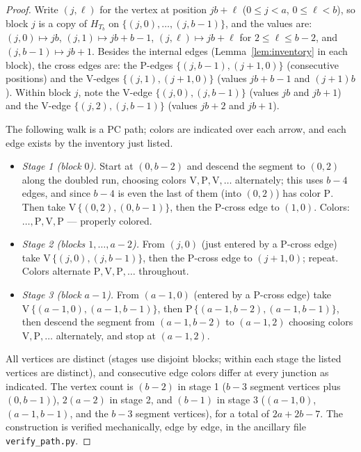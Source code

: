 \documentclass[11pt]{article}
\theoremstyle{definition}
\begin{document}
\begin{proof}
Write $(j, \ell)$ for the vertex at position $jb + \ell$ ($0 \le j < a$,
$0 \le \ell < b$), so block $j$ is a copy of $H_{T_b}$ on $\{(j,0), \dots,
(j,b-1)\}$, and the values are: $(j,0) \mapsto jb$, $(j,1) \mapsto jb + b - 1$,
$(j,\ell) \mapsto jb + \ell$ for $2 \le \ell \le b-2$, and
$(j, b-1) \mapsto jb + 1$. Besides the internal edges (Lemma~\ref{lem:inventory} in
each block), the cross edges are: the P-edges $\{(j, b-1), (j+1, 0)\}$ (consecutive
positions) and the V-edges $\{(j, 1), (j+1, 0)\}$ (values $jb + b - 1$ and
$(j+1)b$). Within block $j$, note the V-edge $\{(j,0), (j,b-1)\}$ (values $jb$ and
$jb+1$) and the V-edge $\{(j,2), (j,b-1)\}$ (values $jb+2$ and $jb+1$).

The following walk is a PC path; colors are indicated over each arrow, and each edge
exists by the inventory just listed.
\begin{itemize}
\item \emph{Stage 1 (block $0$).} Start at $(0, b-2)$ and descend the segment to
$(0, 2)$ along the doubled run, choosing colors
$\mathrm V, \mathrm P, \mathrm V, \dots$ alternately; this uses $b - 4$ edges, and
since $b - 4$ is even the last of them (into $(0,2)$) has color $\mathrm P$. Then
take $\mathrm V\,\{(0,2), (0,b-1)\}$, then the P-cross edge to $(1, 0)$. Colors:
$\dots, \mathrm P, \mathrm V, \mathrm P$ --- properly colored.
\item \emph{Stage 2 (blocks $1, \dots, a-2$).} From $(j, 0)$ (just entered by a
P-cross edge) take $\mathrm V\,\{(j,0), (j,b-1)\}$, then the P-cross edge to
$(j+1, 0)$; repeat. Colors alternate $\mathrm P, \mathrm V, \mathrm P, \dots$
throughout.
\item \emph{Stage 3 (block $a-1$).} From $(a-1, 0)$ (entered by a P-cross edge)
take $\mathrm V\,\{(a-1,0), (a-1,b-1)\}$, then $\mathrm P\,\{(a-1,b-2),
(a-1,b-1)\}$, then descend the segment from $(a-1, b-2)$ to $(a-1, 2)$ choosing
colors $\mathrm V, \mathrm P, \dots$ alternately, and stop at $(a-1, 2)$.
\end{itemize}
All vertices are distinct (stages use disjoint blocks; within each stage the listed
vertices are distinct), and consecutive edge colors differ at every junction as
indicated. The vertex count is $(b - 2)$ in stage 1 ($b-3$ segment vertices plus
$(0, b-1)$), $2(a-2)$ in stage 2, and $(b - 1)$ in stage 3 ($(a-1,0)$,
$(a-1,b-1)$, and the $b-3$ segment vertices), for a total of $2a + 2b - 7$. The
construction is verified mechanically, edge by edge, in the ancillary file
\texttt{verify\_path.py}.
\end{proof}
\end{document}
